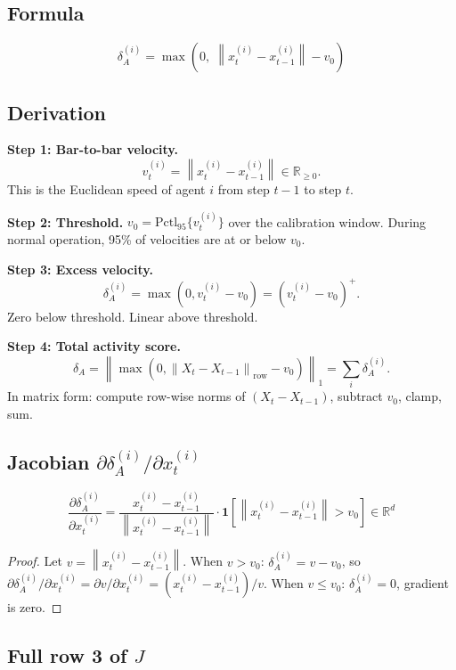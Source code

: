 \documentclass[11pt,a4paper]{article}
\theoremstyle{definition}
\newcommand{\R}{\mathbb{R}}
\newcommand{\norm}[1]{\left\|#1\right\|}
\begin{document}
\subsection{Formula}

\begin{lockedbox}
\[
\delta_A^{(i)} = \max\!\left(0,\; \norm{x_t^{(i)} - x_{t-1}^{(i)}} - v_0\right)
\]
\end{lockedbox}

\subsection{Derivation}

\textbf{Step 1: Bar-to-bar velocity.}
\[
v_t^{(i)} = \norm{x_t^{(i)} - x_{t-1}^{(i)}} \in \R_{\geq 0}.
\]
This is the Euclidean speed of agent $i$ from step $t-1$ to step $t$.

\textbf{Step 2: Threshold.}
$v_0 = \mathrm{Pctl}_{95}\{v_t^{(i)}\}$ over the calibration window.
During normal operation, 95\% of velocities are at or below $v_0$.

\textbf{Step 3: Excess velocity.}
\[
\delta_A^{(i)} = \max(0, v_t^{(i)} - v_0) = (v_t^{(i)} - v_0)^+.
\]
Zero below threshold. Linear above threshold.

\textbf{Step 4: Total activity score.}
\[
\delta_A = \norm{\max(0, \norm{X_t - X_{t-1}}_\mathrm{row} - v_0)}_1 = \sum_i\delta_A^{(i)}.
\]
In matrix form: compute row-wise norms of $(X_t - X_{t-1})$, subtract $v_0$, clamp, sum.

\subsection{Jacobian $\partial\delta_A^{(i)}/\partial x_t^{(i)}$}

\begin{lockedbox}
\[
\frac{\partial\delta_A^{(i)}}{\partial x_t^{(i)}} = \frac{x_t^{(i)} - x_{t-1}^{(i)}}{\norm{x_t^{(i)} - x_{t-1}^{(i)}}} \cdot \mathbf{1}\!\left[\norm{x_t^{(i)}-x_{t-1}^{(i)}} > v_0\right] \in \R^d
\]
\end{lockedbox}

\begin{proof}
Let $v = \norm{x_t^{(i)} - x_{t-1}^{(i)}}$.
When $v > v_0$: $\delta_A^{(i)} = v - v_0$, so
$\partial\delta_A^{(i)}/\partial x_t^{(i)} = \partial v/\partial x_t^{(i)} = (x_t^{(i)}-x_{t-1}^{(i)})/v$.
When $v \leq v_0$: $\delta_A^{(i)} = 0$, gradient is zero.
\end{proof}

\subsection{Full row 3 of $J$}
\end{document}
